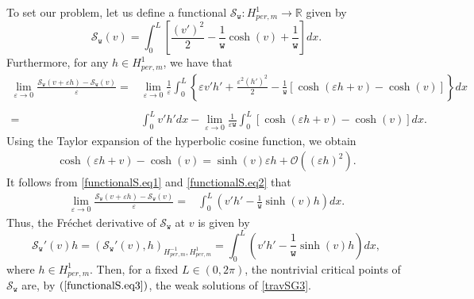 \documentclass[12pt,reqno,a4paper]{amsart} %
\numberwithin{equation}{section}
\numberwithin{figure}{section}
\begin{document}
 To set our problem, let us define a functional  $\mathcal{S}_{\mathtt{w}}:H^1_{per,m} \rightarrow \mathbb{R} $ given by   
 \begin{equation}\label{functionalS}
 	\mathcal{S}_\mathtt{w}(v)= \int_{0}^{L}\left[ \frac{(v')^2}{2}-\frac{1}{\mathtt{w}} \cosh(v) +\frac{1}{\mathtt{w}}\right]dx.
 \end{equation}
 Furthermore, for any $h\in H^1_{per,m} $, we have that 
 \begin{align}\label{functionalS.eq1}
 	\lim_{\varepsilon\rightarrow0} \frac{\mathcal{S}_\mathtt{w}(v+\varepsilon h)-\mathcal{S}_\mathtt{w}(v)}{\varepsilon}=&\lim_{\varepsilon\rightarrow0}\frac{1}{\varepsilon} \int_{0}^{L}\left\{  \varepsilon v'h'+\frac{\varepsilon^2 (h')^2 }{2}  -\frac{1}{\mathtt{w}} \left[\cosh(\varepsilon h+v)-\cosh(v)\right]\right\}dx\nonumber \\ \\=&\int_{0}^{L}  v' h'dx -	\lim_{\varepsilon\rightarrow0}\frac{1}{\varepsilon\mathtt{w}}\int_{0}^{L}\left[\cosh(\varepsilon h+v)-\cosh(v)\right]dx.\nonumber 
 \end{align}
 Using the Taylor expansion of the hyperbolic cosine function, we obtain
 \begin{align}\label{functionalS.eq2}
 	\cosh(\varepsilon h+v)-\cosh(v)=\sinh(v) \varepsilon h+\mathcal{O}((\varepsilon h)^2).  	\end{align}
 It follows from \eqref{functionalS.eq1} and \eqref{functionalS.eq2} that 
 \begin{align*}
 	\lim_{\varepsilon\rightarrow0} \frac{\mathcal{S}_\mathtt{w}(v+\varepsilon h)-\mathcal{S}_\mathtt{w}(v)}{\varepsilon}=&\int_{0}^{L}\left(v'h' -\frac{1}{\mathtt{w}}\sinh(v)h\right)  dx.
 \end{align*}Thus, the Fréchet derivative of $\mathcal{S}_\mathtt{w}$ at $v$ is given by
 \begin{equation}\label{functionalS.eq3}
 	\mathcal{S}_\mathtt{w}'(v) h=(\mathcal{S}_\mathtt{w}'(v), h)_{H^{-1}_{per,m},H_{per,m}^1}=\int_{0}^{L}\left(v'h' -\frac{1}{\mathtt{w}}\sinh(v)h\right)  dx,
 \end{equation}
 where $h\in H^1_{per,m}$. Then, for a fixed $L\in  (0,2\pi)$, the nontrivial critical points of $\mathcal{S}_\mathtt{w}$ are, by $(\ref{functionalS.eq3})$, the weak solutions of \eqref{travSG3}. 
  
\end{document}
